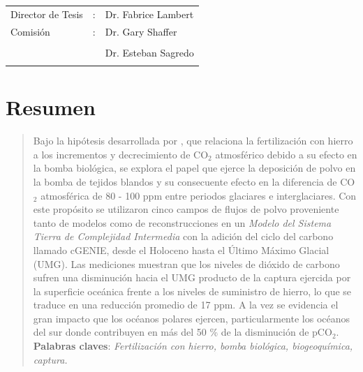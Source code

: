 \documentclass[letterpaper,11pt]{book} %
\begin{document}
\begin{titlepage}
\thispagestyle{empty} %
\vspace{5cm}

\hspace{4cm}\begin{tabular}[c]{lll}
\large Director de Tesis & : & Dr. Fabrice Lambert \large 
\bigskip %
\\
\large Comisi\'{o}n & : & \large Dr. Gary Shaffer \\ \\
& & \large Dr. Esteban Sagredo\\ \\
\end{tabular} 




\end{titlepage}
\thispagestyle{empty}
\vspace{5cm}
\hspace{7cm}{\Large\it Dedicado a ... } %

\setcounter{tocdepth}{1}
\thispagestyle{empty}
\setcounter{page}{1}
\chapter*{Resumen}
\begin{quotation}

Bajo la hip\'otesis desarrollada por \cite{martin1990glacial}, que relaciona la fertilizaci\'on con hierro a los incrementos y decrecimiento de CO$_2$ atmosf\'erico debido a su efecto en la bomba biol\'ogica, se explora el papel que ejerce la deposici\'on de polvo en la bomba de tejidos blandos y su consecuente efecto en la diferencia de CO$_2$ atmosférica de 80 - 100 ppm entre periodos glaciares e interglaciares. Con este propósito se utilizaron cinco campos de flujos de polvo proveniente tanto de modelos como de reconstrucciones en un \textit{Modelo del Sistema Tierra de Complejidad Intermedia} con la adición del ciclo del carbono llamado cGENIE, desde el Holoceno hasta el Último Máximo Glacial (UMG). Las mediciones muestran que los niveles de dióxido de carbono sufren una disminución hacia el UMG producto de la captura ejercida por la superficie oceánica frente a los niveles de suministro de hierro, lo que se traduce en una reducción promedio de 17 ppm. A la vez se evidencia el gran impacto que los océanos polares ejercen, particularmente los océanos del sur donde contribuyen en más del 50 \% de la disminución de pCO$_2$.\\ 

{\bf Palabras claves}: \textit{Fertilización con hierro, bomba biológica, biogeoquímica, captura.}
\end{quotation}
\end{document}
